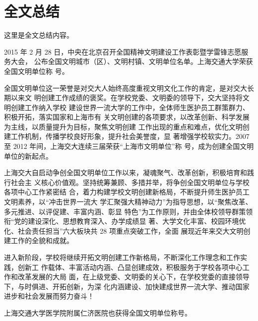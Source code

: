 
\chapter{全文总结}

这里是全文总结内容。

2015 年 2 月 28 日，中央在北京召开全国精神文明建设工作表彰暨学雷锋志愿服务大会，
公布全国文明城市（区）、文明村镇、文明单位名单。上海交通大学荣获全国文明单位称
号。

全国文明单位这一荣誉是对交大人始终高度重视文明文化工作的肯定，是对交大长期以来文
明创建工作成绩的褒奖。在学校党委、文明委的领导下，交大坚持将文明创建工作纳入学校
建设世界一流大学的工作中，全体师生医护员工群策群力、积极开拓，落实国家和上海市有
关文明创建的各项要求，以改革创新、科学发展为主线，以质量提升为目标，聚焦文明创建
工作出现的重点和难点，优化文明创建工作机制，传播学校良好形象，提升社会美誉度，显
著增强学校软实力。2007 至 2012 年间，上海交大连续三届荣获“上海市文明单位”称
号，成为创建全国文明单位的新起点。

上海交大自启动争创全国文明单位工作以来，凝魂聚气、改革创新，积极培育和践行社会主
义核心价值观。坚持统筹兼顾、多措并举，将争创全国文明单位与学校各项中心工作紧密结
合，着力构建学校文明创建新格局，不断提升师生医护员工文明素养，以“冲击世界一流大
学汇聚强大精神动力”为指导思想，以“聚焦改革、多元推进、以评促建、丰富内涵、彰显
特色”为工作原则，并由全体校领导群策领衔“党的建设深化、思想教育深入、办学成绩显
著、大学文化丰富、校园环境优化、社会责任担当”六大板块共 28 项重点突破工作，全面
展现近年来交大文明创建工作的全貌和成就。

进入新阶段，学校将继续开拓文明创建工作新格局，不断深化工作理念和工作实践，创新工
作载体、丰富活动内涵、凸显创建成效，积极服务于学校各项中心工作和改革发展的大局
面，在上级党委、文明委的关心下，在学校党委的直接领导下，与时俱进、开拓创新，为深
化内涵建设、加快建成世界一流大学、推动国家进步和社会发展而努力奋斗！

上海交通大学医学院附属仁济医院也获得全国文明单位称号。
